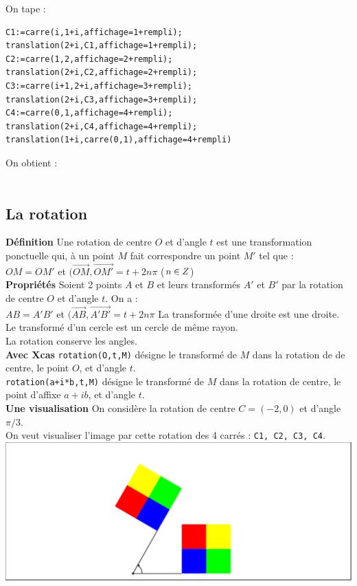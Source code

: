 \documentclass[a4paper,11pt]{book}
\newcommand{\Z}{{\mathbb{Z}}}
\begin{document}
On tape :
\begin{verbatim}
C1:=carre(i,1+i,affichage=1+rempli);
translation(2+i,C1,affichage=1+rempli);
C2:=carre(1,2,affichage=2+rempli);
translation(2+i,C2,affichage=2+rempli);
C3:=carre(i+1,2+i,affichage=3+rempli);
translation(2+i,C3,affichage=3+rempli);
C4:=carre(0,1,affichage=4+rempli);
translation(2+i,C4,affichage=4+rempli);
translation(1+i,carre(0,1),affichage=4+rempli)
\end{verbatim}
On obtient :\\
\ \\
\subsection{La rotation}
{\bf D\'efinition}
Une rotation de centre $O$ et d'angle $t$ est une transformation 
ponctuelle qui, \`a un point $M$ fait correspondre un point $M'$ tel que :\\
$OM=OM'$ et $(\overrightarrow{OM},\overrightarrow{OM'}=t+2n\pi$ ($n\in \\Z$)\\
{\bf Propri\'et\'es}
Soient 2 points $A$ et $B$ et leurs transform\'es $A'$ et $B'$ par la 
rotation de centre $O$ et d'angle $t$. On a :\\
$AB=A'B'$ et $(\overrightarrow{AB},\overrightarrow{A'B'}=t+2n\pi$
La transform\'ee d'une droite est une droite.\\
Le transform\'e d'un cercle est un cercle de m\^eme rayon.\\
La rotation conserve les angles.\\
{\bf Avec Xcas}
{\tt rotation(O,t,M)} d\'esigne le transform\'e de $M$ dans la rotation de 
de centre, le point $O$, et d'angle $t$.\\
{\tt rotation(a+i*b,t,M)} d\'esigne le transform\'e de $M$ dans la rotation 
de centre, le point d'affixe $a+ib$, et d'angle $t$.\\
{\bf Une visualisation}
On consid\`ere la rotation de centre $C=(-2,0)$ et d'angle $\pi/3$.\\
On veut visualiser l'image par cette rotation des 4 carr\'es :
{\tt C1, C2, C3, C4}.\\
\includegraphics[width=\textwidth]{damierrot1}\\
\end{document}
